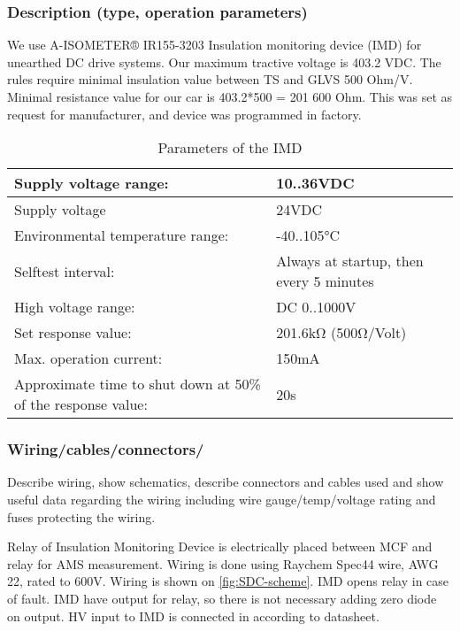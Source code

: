 \subsubsection{Description (type, operation parameters)}
\iffalse Describe the IMD used and use a table for the common operation parameters, like supply voltage, set point, etc. Also, describe how the IMD indicator light is wired, etc.
Additionally, fill out the following table replacing the values with your specification:\fi

We use A-ISOMETER® IR155-3203 Insulation monitoring device (IMD) for unearthed DC drive systems. Our maximum tractive voltage is 403.2 VDC. The rules require minimal insulation value between TS and GLVS 500 Ohm/V. Minimal resistance value for our car is 403.2*500 = 201 600 Ohm. This was set as request for manufacturer, and device was programmed in factory.
\begin{table}[H]
	\centering
	\caption{Parameters of the IMD}
	\begin{tabularx}{\textwidth}{|X|l|}
	 \hline	Supply voltage range: & 10..36VDC \\[.4cm]
	 \hline	Supply voltage & 24VDC \\[.4cm]
	 \hline	Environmental temperature range: & -40..105°C \\[.4cm]
	 \hline	Selftest interval: & Always at startup, then every 5 minutes \\[.4cm]
	 \hline	High voltage range: & DC 0..1000V \\[.4cm]
	 \hline	Set response value: & 201.6kΩ (500Ω/Volt) \\[.4cm]
	 \hline	Max. operation current: & 150mA \\[.4cm]
	 \hline	Approximate time to shut down at 50\% of the response value: & 20s \\[.4cm]
	  \hline
	\end{tabularx}%
	\label{tab:IMD}%
\end{table}%

\subsubsection{Wiring/cables/connectors/}
 Describe wiring, show schematics, describe connectors and cables used and show useful data regarding the wiring including wire gauge/temp/voltage rating and fuses protecting the wiring. 

Relay of Insulation Monitoring Device is electrically placed between MCF and relay for AMS measurement. Wiring is done using Raychem Spec44 wire, AWG 22, rated to 600V. Wiring is shown on \ref{fig:SDC-scheme}. IMD opens relay in case of fault. IMD have output for relay, so there is not necessary adding zero diode on output. HV input to IMD is connected in according to datasheet.

